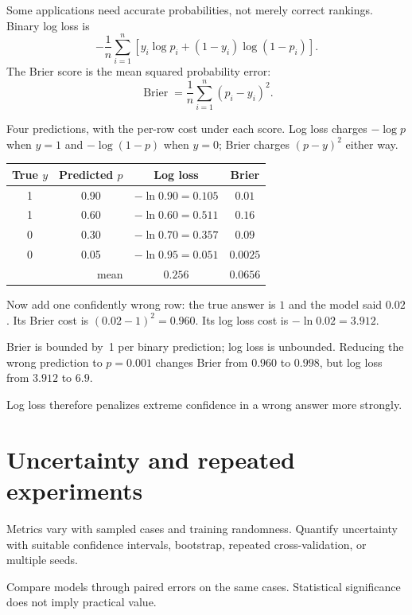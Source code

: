 Some applications need accurate probabilities, not merely correct rankings. Binary log loss is
\[
  -\frac{1}{n}\sum_{i=1}^{n}
  [y_i\log p_i+(1-y_i)\log(1-p_i)].
\]
The Brier score is the mean squared probability error:
\[
  \operatorname{Brier}
  =\frac{1}{n}\sum_{i=1}^{n}{(p_i-y_i)}^2.
\]

\begin{workedexample}
Four predictions, with the per-row cost under each score. Log loss charges $-\log p$ when $y=1$ and $-\log(1-p)$ when $y=0$; Brier charges ${(p-y)}^2$ either way.

\begin{mltable}\small
\begin{tabular}{cccc}
\toprule
\rowcolor{MLPaleBlue!92}
True $y$ & Predicted $p$ & Log loss & Brier \\
\midrule
1 & 0.90 & $-\ln 0.90 = 0.105$ & $0.01$ \\
1 & 0.60 & $-\ln 0.60 = 0.511$ & $0.16$ \\
0 & 0.30 & $-\ln 0.70 = 0.357$ & $0.09$ \\
0 & 0.05 & $-\ln 0.95 = 0.051$ & $0.0025$ \\
\midrule
\multicolumn{2}{r}{mean} & $0.256$ & $0.0656$ \\
\bottomrule
\end{tabular}
\end{mltable}

Now add one confidently wrong row: the true answer is $1$ and the model said $0.02$. Its Brier cost is ${(0.02-1)}^2=0.960$. Its log loss cost is $-\ln 0.02 = 3.912$.

Brier is bounded by~1 per binary prediction; log loss is unbounded. Reducing the wrong prediction to $p=0.001$ changes Brier from $0.960$ to $0.998$, but log loss from $3.912$ to $6.9$.

Log loss therefore penalizes extreme confidence in a wrong answer more strongly.
\end{workedexample}

\section{Uncertainty and repeated experiments}

Metrics vary with sampled cases and training randomness. Quantify uncertainty with suitable confidence intervals, bootstrap, repeated cross-validation, or multiple seeds.

Compare models through paired errors on the same cases. Statistical significance does not imply practical value.

